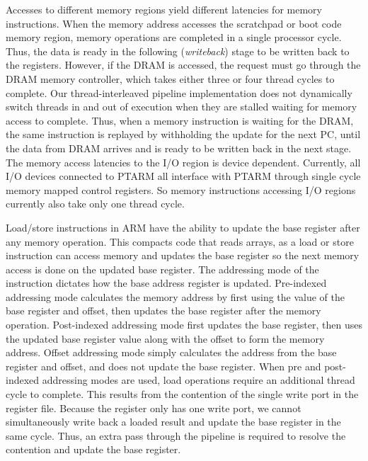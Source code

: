 Accesses to different memory regions yield different latencies for memory instructions.
When the memory address accesses the scratchpad or boot code memory region, memory operations are completed in a single processor cycle.
Thus, the data is ready in the following (\emph{writeback}) stage to be written back to the registers.
However, if the DRAM is accessed, the request must go through the DRAM memory controller, which takes either three or four thread cycles to complete.
Our thread-interleaved pipeline implementation does not dynamically switch threads in and out of execution when they are stalled waiting for memory access to complete. 
Thus, when a memory instruction is waiting for the DRAM, the same instruction is replayed by withholding the update for the next PC, until the data from DRAM arrives and is ready to be written back in the next stage.
The memory access latencies to the I/O region is device dependent.   
Currently, all I/O devices connected to PTARM all interface with PTARM through single cycle memory mapped control registers.
So memory instructions accessing I/O regions currently also take only one thread cycle.  

Load/store instructions in ARM have the ability to update the base register after any memory operation. 
This compacts code that reads arrays, as a load or store instruction can access memory and updates the base register so the next memory access is done on the updated base register.
The addressing mode of the instruction dictates how the base address register is updated. 
Pre-indexed addressing mode calculates the memory address by first using the value of the base register and offset, then updates the base register after the memory operation. 
Post-indexed addressing mode first updates the base register, then uses the updated base register value along with the offset to form the memory address.
Offset addressing mode simply calculates the address from the base register and offset, and does not update the base register. 
When pre and post-indexed addressing modes are used, load operations require an additional thread cycle to complete.
This results from the contention of the single write port in the register file. 
Because the register only has one write port, we cannot simultaneously write back a loaded result and update the base register in the same cycle.
Thus, an extra pass through the pipeline is required to resolve the contention and update the base register. 

